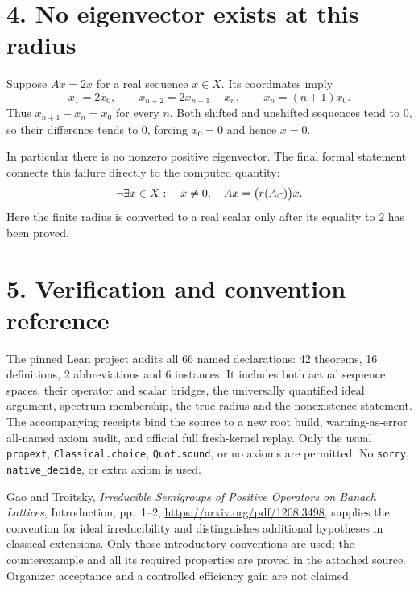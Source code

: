 \documentclass[10pt]{article}
\begin{document}
\section*{4. No eigenvector exists at this radius}
Suppose $Ax=2x$ for a real sequence $x\in X$. Its coordinates imply
\[
x_1=2x_0,\qquad
x_{n+2}=2x_{n+1}-x_n,
\qquad
x_n=(n+1)x_0.
\]
Thus $x_{n+1}-x_n=x_0$ for every $n$. Both shifted and unshifted sequences tend to $0$, so their difference tends to $0$, forcing $x_0=0$ and hence $x=0$.

In particular there is no nonzero positive eigenvector. The final formal statement connects this failure directly to the computed quantity:
\[
\neg\exists x\in X:\quad x\ne0,\quad
Ax=\bigl(r(A_{\mathbb C})\bigr)x.
\]
Here the finite radius is converted to a real scalar only after its equality to $2$ has been proved.

\section*{5. Verification and convention reference}
The pinned Lean project audits all 66 named declarations: 42 theorems, 16 definitions, 2 abbreviations and 6 instances. It includes both actual sequence spaces, their operator and scalar bridges, the universally quantified ideal argument, spectrum membership, the true radius and the nonexistence statement. The accompanying receipts bind the source to a new root build, warning-as-error all-named axiom audit, and official full fresh-kernel replay. Only the usual \texttt{propext}, \texttt{Classical.choice}, \texttt{Quot.sound}, or no axioms are permitted. No \texttt{sorry}, \texttt{native\_decide}, or extra axiom is used.

Gao and Troitsky, \emph{Irreducible Semigroups of Positive Operators on Banach Lattices}, Introduction, pp.\ 1--2, \url{https://arxiv.org/pdf/1208.3498}, supplies the convention for ideal irreducibility and distinguishes additional hypotheses in classical extensions. Only those introductory conventions are used; the counterexample and all its required properties are proved in the attached source. Organizer acceptance and a controlled efficiency gain are not claimed.
\end{document}
